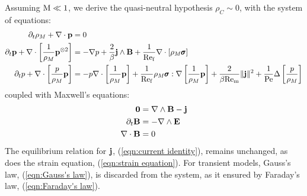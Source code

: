     Assuming $\mathrm{M}  \ll  1$, we derive the quasi-neutral hypothesis $\rho_{C}  \sim  0$, with the system of equations:
    {\small \begin{align}
        \partial_{t}\rho_{M} + \nabla\cdot\mathbf{p}  &=  0  \label{eqn:mass conservation} 
         \\
        \partial_{t}\mathbf{p} + \nabla\cdot\left[\frac{1}{\rho_{M}}\mathbf{p}^{\otimes 2}\right]  &=  - \nabla p + \frac{2}{\beta}\mathbf{j}\wedge\mathbf{B} + \frac{1}{\mathrm{Re}_{\mathrm{f}}}\nabla\cdot[\rho_{M}\pmb{\mathsf{\sigma}}]  \label{eqn:momentum conservation}  \\
        \partial_{t}p + \nabla\cdot\left[\frac{p}{\rho_{M}}\mathbf{p}\right]  &=  - p\nabla\cdot\left[\frac{1}{\rho_{M}}\mathbf{p}\right] + \frac{1}{\mathrm{Re}_{\mathrm{f}}}\rho_{M}\pmb{\mathsf{\sigma}}:\nabla\left[\frac{1}{\rho_{M}}\mathbf{p}\right] + \frac{2}{\beta\mathrm{Re}_{\mathrm{m}}}\|\mathbf{j}\|^{2} + \frac{1}{\mathrm{Pe}}\Delta\left[\frac{p}{\rho_{M}}\right]  \label{eqn:energy conservation}
    \end{align}}
    coupled with Maxwell's equations:
    \begin{align}
        \mathbf{0}  &=  \nabla\wedge\mathbf{B} - \mathbf{j}  \label{eqn:Ampère's law}  \\
        \partial_{t}\mathbf{B}  &=  - \nabla\wedge\mathbf{E}  \label{eqn:Faraday's law}  \\
        \nabla\cdot\mathbf{B}  &=  0  \label{eqn:Gauss's law}
    \end{align}
    The equilibrium relation for $\mathbf{j}$, (\ref{eqn:current identity}), remains unchanged, as does the strain equation, (\ref{eqn:strain equation}). For transient models, Gauss's law, (\ref{eqn:Gauss's law}), is discarded from the system, as it ensured by Faraday's law, (\ref{eqn:Faraday's law}).

